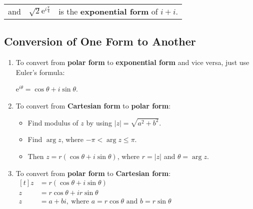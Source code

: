 \documentclass[11pt,a4paper]{book}
\begin{document}
\begin{center}
\begin{tabular}[t]{>{\raggedright}p{0.8cm}>{\raggedright}p{3cm}>{\raggedright}p{6cm}}
and & $\sqrt{2}\mathrm{e}^{i\frac{\pi}{4}}$ & is the \textbf{exponential form} of $i+i$.\tabularnewline
\end{tabular}
\par\end{center}

\subsection{Conversion of One Form to Another}

\begin{enumerate}

\item  To convert from \textbf{polar form} to \textbf{exponential
form} and vice versa, just use Euler's formula:

$\mathrm{e}^{i\theta}=\cos\theta+i\sin\theta$.

\item  To convert from \textbf{Cartesian form }to \textbf{polar form}:

\begin{itemize}

\item  Find modulus of $z$ by using $\left|z\right|=\sqrt{a^{2}+b^{2}}$.

\item  Find $\arg z$, where $-\pi<\arg z\leq\pi$.

\item  Then $z=r\left(\cos\theta+i\sin\theta\right)$, where $r=\left|z\right|$ and $\theta=\arg z$.

\end{itemize}

\item  To convert from \textbf{polar form} to \textbf{Cartesian form}:
$
\begin{aligned}[t]
z & =r\left(\cos\theta+i\sin\theta\right)\\
z & =r\cos\theta+ir\sin\theta\\
z & =a+bi,\:\text{where }a=r\cos\theta\text{ and }b=r\sin\theta
\end{aligned}
$

\end{enumerate}
\end{document}
